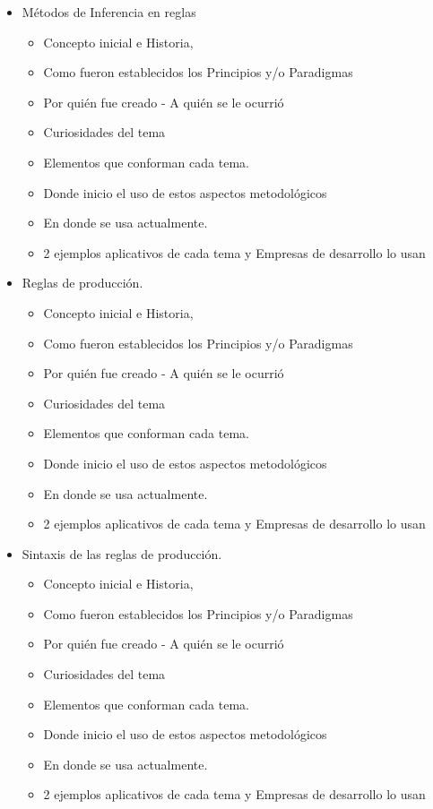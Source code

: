 \documentclass[12pt]{article}
\begin{document}
\begin{itemize}
	\item Métodos de Inferencia en reglas
			\begin{itemize}
	   \item Concepto inicial e Historia,
	\item Como fueron establecidos los Principios y/o Paradigmas
	\item Por quién fue creado - A quién se le ocurrió
	\item Curiosidades del tema
	\item Elementos que conforman cada tema.
	\item Donde inicio el uso de estos aspectos metodológicos
	\item En donde se usa actualmente.
	\item 2 ejemplos aplicativos de cada tema y Empresas de desarrollo lo usan
	\end{itemize}
	
	\item Reglas de producción.
		\begin{itemize}
	   \item Concepto inicial e Historia,
	\item Como fueron establecidos los Principios y/o Paradigmas
	\item Por quién fue creado - A quién se le ocurrió
	\item Curiosidades del tema
	\item Elementos que conforman cada tema.
	\item Donde inicio el uso de estos aspectos metodológicos
	\item En donde se usa actualmente.
	\item 2 ejemplos aplicativos de cada tema y Empresas de desarrollo lo usan
	\end{itemize}
	
	\item Sintaxis de las reglas de producción.
			\begin{itemize}
	   \item Concepto inicial e Historia,
	\item Como fueron establecidos los Principios y/o Paradigmas
	\item Por quién fue creado - A quién se le ocurrió
	\item Curiosidades del tema
	\item Elementos que conforman cada tema.
	\item Donde inicio el uso de estos aspectos metodológicos
	\item En donde se usa actualmente.
	\item 2 ejemplos aplicativos de cada tema y Empresas de desarrollo lo usan
	\end{itemize}
	

\end{itemize}
\end{document}
